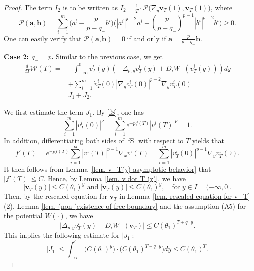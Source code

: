 \documentclass[11pt,twoside,reqno]{amsart}
\newcounter{assu}
\numberwithin{equation}{section}
\begin{document}
\begin{proof}
The term $I_{2}$ is to be written as $I_{2}=\frac{1}{T}\cdot\mathcal{P}\Big(\nabla_{y}\mathbf{v}_{T}(1),\mathbf{v}_{T}(1)\Big)$, where
\begin{equation*}
    \mathcal{P}(\mathbf{a},\mathbf{b})=\sum_{i=1}^{m}\Big(a^{i}-\frac{p}{p-q_{-}}b^{i}\Big)\Big(|a^{i}|^{p-2}a^{i}-(\frac{p}{p-q_{-}})^{p-1}|b^{i}|^{p-2}b^{i}\Big)\geq0.
\end{equation*}
One can easily verify that $\mathcal{P}(\mathbf{a},\mathbf{b})=0$ if and only if $\mathbf{a}=\frac{p}{p-q_{-}}\mathbf{b}$.

{\bf{Case 2:  $q_{-}=p$.}} Similar to the previous case, we get
$$
\begin{aligned}
\frac{d}{dT}\mathcal{W}(T)=&-\int_{-\infty}^0 \dot{v}_T^i(y)   \left(-\Delta_{p,y}v_T^i(y) +D_iW_{-}( v_T^i(y))      \right)dy \\
&+\sum_{i=1}^m \dot{v}_T^i(0) |\nabla_y v_T^i(0)|^{p-2} \nabla_y v_T^i(0)\\
:=&J_1+J_2.
\end{aligned}
$$

We first estimate the term $J_1$. By \eqref{fS}, one has
\begin{equation*}
    \sum_{i=1}^m |v_T^i(0)|^p= \sum_{i=1}^m e^{-pf(T)}{|v^i(T)|^p}=1.
\end{equation*}
In addition, differentiating both sides of \eqref{fS} with respect to $T$ yields that
\begin{equation}\label{eq. f'(T) expression}
    f'(T)=e^{-pf(T)}\sum_{i=1}^m |v^i(T)|^{p-1}  \nabla_x v^i(T)=\sum_{i=1}^m |v_T^i(0)|^{p-1}\nabla_y v^i_T(0).
\end{equation}
It then follows from Lemma~\ref{lem. v_T(y) asymptotic behavior} that $|f'(T)|\leq C$. Hence, by Lemma~\ref{lem. v dot T (y)}, we have
\begin{equation*}
    |\mathbf{v}_{T}(y)|\le C (\theta_{1})^{y}\mbox{ and } |\dot{\mathbf{v}}_{T}(y)|\leq C(\theta_{1})^{y},\quad\mbox{for }y\in I=(-\infty,0].
\end{equation*}
Then, by the rescaled equation for $\mathbf{v}_{T}$ in Lemma~\ref{lem. rescaled equation for v_T} (2), Lemma \ref{lem. (non-)existence of free boundary} and  the assumption (A5) for the potential $W(\cdot)$, we have
\begin{equation*}
    \Big|\Delta_{p,y}v^{i}_{T}(y)-D_{i}W_{-}(\mathbf{v}_{T})\Big|\leq C (\theta_1)^{T+q_-y}.
\end{equation*}
This implies the following estimate for $|J_{1}|$:
\begin{equation*}
    |J_{1}|\leq\int_{-\infty}^0\Big(C(\theta_{1})^{y}\Big)\cdot\Big(C(\theta_1)^{T+q_-y}\Big)dy\leq C(\theta_1)^T.
\end{equation*}


\end{proof}
\end{document}
